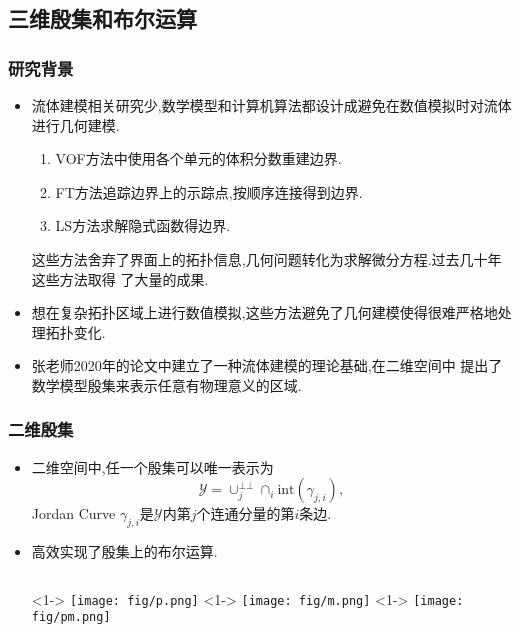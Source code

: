 \documentclass[UTF8]{ctexbeamer}	%
\theoremstyle{plain}
\theoremstyle{definition}
\theoremstyle{remark}
\numberwithin{equation}{section}
\begin{document}
\subsection{三维殷集和布尔运算}
\begin{frame}
    \frametitle{研究背景}
    \begin{itemize}
        \item 流体建模相关研究少,数学模型和计算机算法都设计成避免在数值模拟时对流体
        进行几何建模.
        \begin{enumerate}
            \item VOF方法中使用各个单元的体积分数重建边界.
            \item FT方法追踪边界上的示踪点,按顺序连接得到边界.
            \item LS方法求解隐式函数得边界.
        \end{enumerate}
        这些方法舍弃了界面上的拓扑信息,几何问题转化为求解微分方程.过去几十年这些方法取得
        了大量的成果.
        \item 想在复杂拓扑区域上进行数值模拟,这些方法避免了几何建模使得很难严格地处理拓扑变化.
        \item 张老师2020年的论文中建立了一种流体建模的理论基础,在二维空间中
        提出了数学模型殷集来表示任意有物理意义的区域.
    \end{itemize}
\end{frame}

\begin{frame}
    \frametitle{二维殷集}
    \begin{itemize}
        \item 二维空间中,任一个殷集可以唯一表示为
        \[\mathcal{Y} = \cup_j^{\bot \bot}\cap_i \text{int}(\gamma_{j, i} ),\]
        Jordan Curve $\gamma_{j, i}$是$\mathcal{Y}$内第$j$个连通分量的第$i$条边.
        \item 高效实现了殷集上的布尔运算. 
        \begin{columns}
            <1->
                \texttt{[image: fig/p.png]}
            <1->
            \texttt{[image: fig/m.png]}
            <1->
            \texttt{[image: fig/pm.png]}
        \end{columns}
    \end{itemize}
\end{frame}
\end{document}
